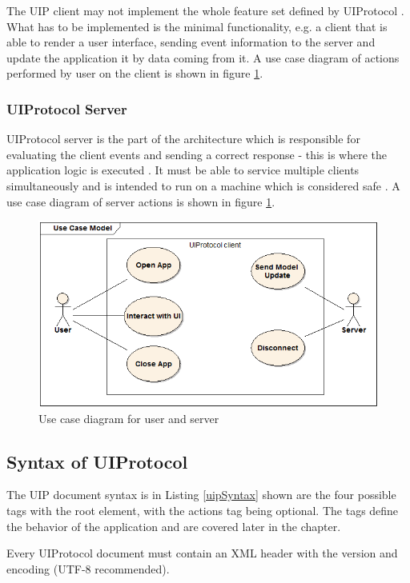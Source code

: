 The UIP client may not implement the whole feature set defined by UIProtocol \cite{uip}. What has to be implemented is the minimal functionality, e.g. a client that is able to render a user interface, sending event information to the server and update the application it by data coming from it. A use case diagram of actions performed by user on the client is shown in figure \ref{fig:UIPusecase}.

\subsubsection{UIProtocol Server}
UIProtocol server is the part of the architecture which is responsible for evaluating the client events and sending a correct response - this is where the application logic is executed \cite{uip}. It must be able to service multiple clients simultaneously and is intended to run on a machine which is considered safe \cite{uip}. A use case diagram of server actions is shown in figure \ref{fig:UIPusecase}.

\begin{figure}[ht!]
\centering
\includegraphics[width=120mm]{pics/usecase.png}
\caption{Use case diagram for user and server}

\label{fig:UIPusecase}
\end{figure}

\subsection{Syntax of UIProtocol}
The UIP document syntax is in Listing \ref{uipSyntax} shown are the four possible tags with the root element, with the actions tag being optional. The tags define the behavior of the application and are covered later in the chapter.

Every UIProtocol document must contain an XML header with the version and encoding (UTF-8 recommended).

